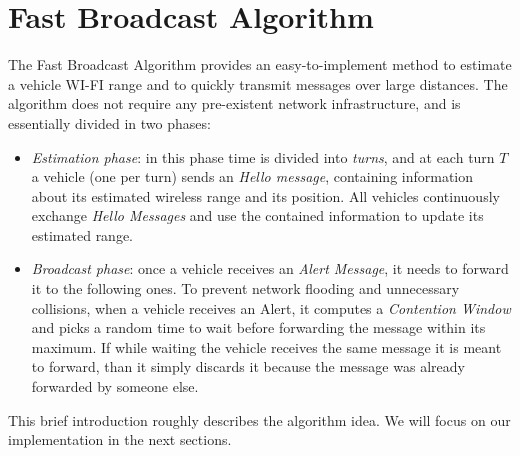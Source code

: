 \section{Fast Broadcast Algorithm}
\label{sec:fast_broadcast}
The Fast Broadcast Algorithm provides an easy-to-implement method to estimate a vehicle WI-FI range and to quickly transmit messages over large distances. The algorithm does not require any pre-existent network infrastructure, and is essentially divided in two phases:
	\begin{itemize}
		\item \emph{Estimation phase}: in this phase time is divided into \textit{turns}, and at each turn $T$ a vehicle (one per turn) sends an \emph{Hello message}, containing information about its estimated wireless range and its position. All vehicles continuously exchange \emph{Hello Messages} and use the contained information to update its estimated range.
		\item \emph{Broadcast phase}: once a vehicle receives an \textit{Alert Message}, it needs to forward it to the following ones. To prevent network flooding and unnecessary collisions, when a vehicle receives an Alert, it computes a \textit{Contention Window} and picks a random time to wait before forwarding the message within its maximum. If while waiting the vehicle receives the same message it is meant to forward, than it simply discards it because the message was already forwarded by someone else.
	\end{itemize} 
	
This brief introduction roughly describes the algorithm idea. We will focus on our implementation in the next sections.
